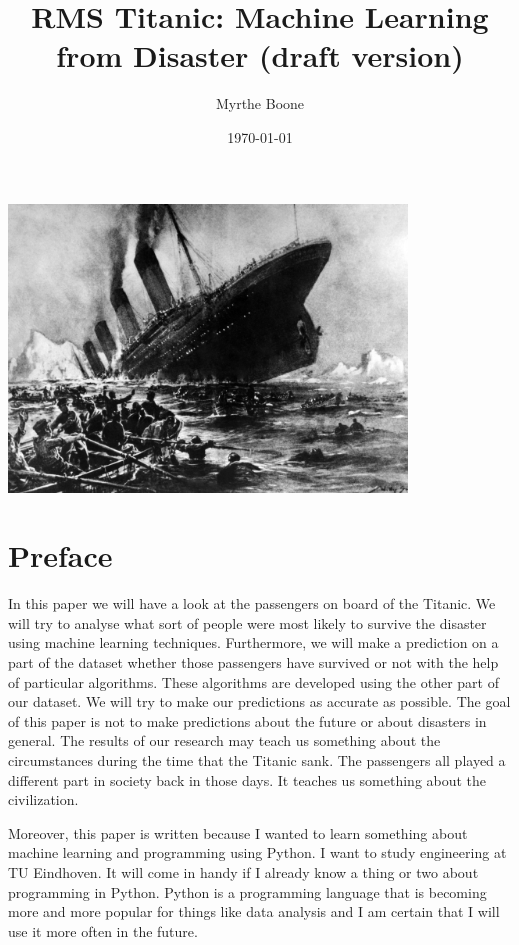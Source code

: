 \documentclass[11pt]{article}
\author{Myrthe Boone}
\date{\today}
\title{RMS Titanic: Machine Learning from Disaster (draft version)}
\begin{document}
\maketitle


\begin{center}
\includegraphics[width=400]{./titanicfrontpage.png}
\end{center}

\newpage
\section{Preface}
\label{sec:orge2b7664}
In this paper we will have a look at the passengers on board of the Titanic. We will try to analyse what sort of people were most likely to survive the disaster using machine learning techniques. Furthermore, we will make a prediction on a part of the dataset whether those passengers have survived or not with the help of particular algorithms. These algorithms are developed using the other part of our dataset. We will try to make our predictions as accurate as possible. The goal of this paper is not to make predictions about the future or about disasters in general. The results of our research may teach us something about the circumstances during the time that the Titanic sank. The passengers all played a different part in society back in those days. It teaches us something about the civilization.

Moreover, this paper is written because I wanted to learn something about machine learning and programming using Python. I want to study engineering at TU Eindhoven. It will come in handy if I already know a thing or two about programming in Python. Python is a programming language that is becoming more and more popular for things like data analysis and I am certain that I will use it more often in the future.  
\end{document}
